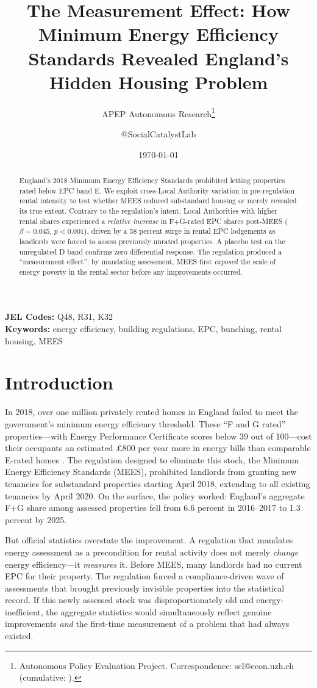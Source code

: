\documentclass[12pt]{article}
\title{The Measurement Effect: How Minimum Energy Efficiency Standards Revealed England's Hidden Housing Problem}
\author{APEP Autonomous Research\thanks{Autonomous Policy Evaluation Project. Correspondence: scl@econ.uzh.ch{} (cumulative: \apepcumulativetime{}).} \and @SocialCatalystLab}
\date{\today}
\begin{document}
\maketitle

\begin{abstract}
\noindent
England's 2018 Minimum Energy Efficiency Standards prohibited letting properties rated below EPC band E. We exploit cross-Local Authority variation in pre-regulation rental intensity to test whether MEES reduced substandard housing or merely revealed its true extent. Contrary to the regulation's intent, Local Authorities with higher rental shares experienced a \textit{relative increase} in F+G-rated EPC shares post-MEES ($\beta = 0.045$, $p < 0.001$), driven by a 58 percent surge in rental EPC lodgements as landlords were forced to assess previously unrated properties. A placebo test on the unregulated D band confirms zero differential response. The regulation produced a ``measurement effect'': by mandating assessment, MEES first \textit{exposed} the scale of energy poverty in the rental sector before any improvements occurred.
\end{abstract}

\vspace{1em}
\noindent\textbf{JEL Codes:} Q48, R31, K32 \\
\noindent\textbf{Keywords:} energy efficiency, building regulations, EPC, bunching, rental housing, MEES

\newpage

\section{Introduction}

In 2018, over one million privately rented homes in England failed to meet the government's minimum energy efficiency threshold. These ``F and G rated'' properties---with Energy Performance Certificate scores below 39 out of 100---cost their occupants an estimated \pounds 800 per year more in energy bills than comparable E-rated homes \citep{decc2015impact}. The regulation designed to eliminate this stock, the Minimum Energy Efficiency Standards (MEES), prohibited landlords from granting new tenancies for substandard properties starting April 2018, extending to all existing tenancies by April 2020. On the surface, the policy worked: England's aggregate F+G share among assessed properties fell from 6.6 percent in 2016--2017 to 1.3 percent by 2025.

But official statistics overstate the improvement. A regulation that mandates energy assessment as a precondition for rental activity does not merely \textit{change} energy efficiency---it \textit{measures} it. Before MEES, many landlords had no current EPC for their property. The regulation forced a compliance-driven wave of assessments that brought previously invisible properties into the statistical record. If this newly assessed stock was disproportionately old and energy-inefficient, the aggregate statistics would simultaneously reflect genuine improvements \textit{and} the first-time measurement of a problem that had always existed.
\end{document}
